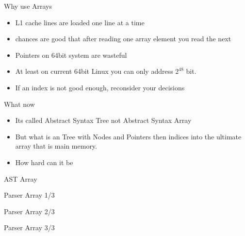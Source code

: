 \documentclass[aspectratio=169,notes]{beamer}
\begin{document}
	\begin{frame}[fragile]{Why use Arrays}
		\begin{itemize}
			\item L1 cache lines are loaded one line at a time
			\item chances are good that after reading one array element you read the next
			\item Pointers on 64bit system are wasteful
			\pause
			\item At least on current 64bit Linux you can only address $2^{48}$ bit.
			\vspace{1cm}
			\item If an \lstinline@uint@ index is not good enough, reconsider
your decisions
		\end{itemize}
	\end{frame}

	\begin{frame}[fragile]{What now}
		\begin{itemize}
			\item Its called Abstract Syntax Tree not Abstract Syntax Array
			\pause
			\vspace{1cm}
			\item But what is an Tree with Nodes and Pointers then indices into the
ultimate array that is main memory.
			\pause
			\vspace{1cm}
			\item How hard can it be
		\end{itemize}
	\end{frame}

	\begin{frame}[fragile]{AST Array}
		
	\end{frame}

	\begin{frame}[fragile]{Parser Array 1/3}
		
	\end{frame}

	\begin{frame}[fragile]{Parser Array 2/3}
		
	\end{frame}

	\begin{frame}[fragile]{Parser Array 3/3}
		
	\end{frame}
\end{document}
